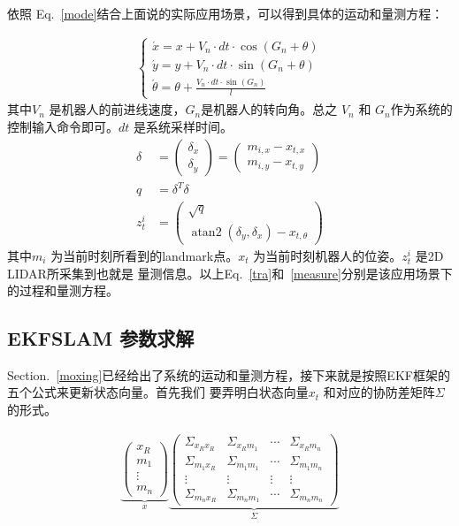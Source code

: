 \documentclass[UTF8,a4paper,10pt]{ctexart}
\DeclareMathOperator{\atantwo}{atan2}
\begin{document}
依照 Eq.~\eqref{mode}结合上面说的实际应用场景，可以得到具体的运动和量测方程：

\begin{align}
\left\{
       \begin{array}{lr}
       \acute x=x+V_n \cdot dt\cdot \cos(G_n+\theta) \\
       \acute y=y+V_n \cdot dt \cdot \sin(G_n+\theta) \\
       \acute \theta=\theta+\frac{V_n \cdot dt \cdot \sin (G_n)}{l} 
       \end{array}
\right.
\label{tra}
\end{align}
其中$V_n$ 是机器人的前进线速度，$G_n$是机器人的转向角。总之
$V_n$ 和 $G_n$作为系统的控制输入命令即可。$dt$ 是系统采样时间。
\begin{align}
\delta &=
\left(
 \begin{array}{c}
    \delta_x\\
    \delta_y
  \end{array}
\right)
=\left(
 \begin{array}{c}
    m_{i,x}-x_{t,x}\\
    m_{i,y}-x_{t,y}
  \end{array}
\right)\\
q&=\delta^T\delta\\
z_t^i&=\left(
 \begin{array}{c}
    \sqrt{q}\\
  \atantwo(\delta_y,\delta_x)-x_{t,\theta}
  \end{array}
\right)
\label{measure}
\end{align}
其中$m_{i}$ 为当前时刻所看到的landmark点。$x_t$ 为当前时刻机器人的位姿。$z_t^i$ 是2D LIDAR所采集到也就是
量测信息。以上Eq.~\eqref{tra}和~\eqref{measure}分别是该应用场景下的过程和量测方程。

\subsection{EKFSLAM 参数求解}

Section.~\ref{moxing}已经给出了系统的运动和量测方程，接下来就是按照EKF框架的五个公式来更新状态向量。首先我们
要弄明白状态向量$x_t$ 和对应的协防差矩阵$\Sigma$的形式。

\begin{align}
\underbrace{\left(
 \begin{array}{c}
  x_R \\
  m_1 \\
  \vdots\\ 
  m_n
 \end{array}
\right)}_{x}
\underbrace{\left(
 \begin{array}{cccc}
\Sigma_{x_Rx_R}&  \Sigma_{x_Rm_1}& \cdots&  \Sigma_{x_Rm_n}\\
\Sigma_{m_1x_R}&  \Sigma_{m_1m_1}& \cdots&  \Sigma_{m_1m_n}\\
\vdots&           \vdots&          \vdots&  \vdots\\
\Sigma_{m_nx_R}&  \Sigma_{m_nm_1}& \cdots&  \Sigma_{m_nm_n}
 \end{array}
\right)}_{\Sigma}
\end{align}
\end{document}
